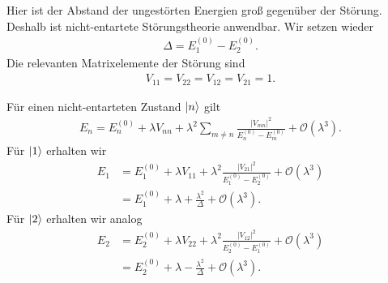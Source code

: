 \documentclass[11pt,a4paper]{scrartcl}
\newcommand{\abs}[1]{\left| #1 \right|}
\begin{document}
\begin{enumerate}[label=(\alph*)]
        \begin{calculationbox}
            Hier ist der Abstand der ungestörten Energien groß gegenüber der Störung. Deshalb ist nicht-entartete Störungstheorie anwendbar. Wir setzen wieder
            \begin{align*}
                \Delta=E_1^{(0)}-E_2^{(0)}.
            \end{align*}
            Die relevanten Matrixelemente der Störung sind
            \begin{align*}
                V_{11}=V_{22}=V_{12}=V_{21}=1.
            \end{align*}

            \begin{calculationbox}[title=Energien bis zweiter Ordnung]
                Für einen nicht-entarteten Zustand $\ket n$ gilt
                \begin{align*}
                    E_n
                    =
                    E_n^{(0)}
                    +\lambda V_{nn}
                    +\lambda^2\sum_{m\neq n}
                    \frac{\abs{V_{mn}}^2}{E_n^{(0)}-E_m^{(0)}}
                    +\mathcal O(\lambda^3).
                \end{align*}
                Für $\ket 1$ erhalten wir
                \begin{align*}
                    E_1
                    &=
                    E_1^{(0)}
                    +\lambda V_{11}
                    +\lambda^2\frac{\abs{V_{21}}^2}{E_1^{(0)}-E_2^{(0)}}
                    +\mathcal O(\lambda^3)\\
                    &=
                    E_1^{(0)}
                    +\lambda
                    +\frac{\lambda^2}{\Delta}
                    +\mathcal O(\lambda^3).
                \end{align*}
                Für $\ket 2$ erhalten wir analog
                \begin{align*}
                    E_2
                    &=
                    E_2^{(0)}
                    +\lambda V_{22}
                    +\lambda^2\frac{\abs{V_{12}}^2}{E_2^{(0)}-E_1^{(0)}}
                    +\mathcal O(\lambda^3)\\
                    &=
                    E_2^{(0)}
                    +\lambda
                    -\frac{\lambda^2}{\Delta}
                    +\mathcal O(\lambda^3).
                \end{align*}


\end{calculationbox}
\end{calculationbox}
\end{enumerate}
\end{document}
